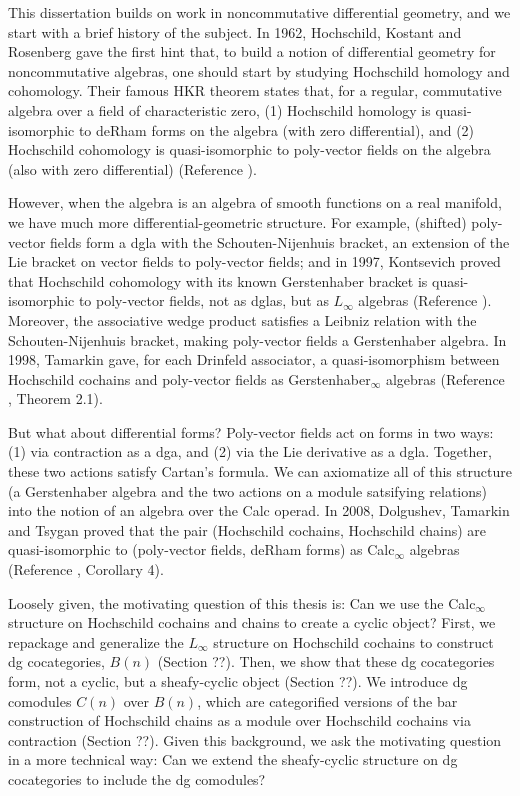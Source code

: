 \documentclass[12pt]{article} %
\begin{document}
This dissertation builds on work in noncommutative differential geometry, and we start with a brief history of the subject. In 1962, Hochschild, Kostant and Rosenberg gave the first hint that, to build a notion of differential geometry for noncommutative algebras, one should start by studying Hochschild homology and cohomology. Their famous HKR theorem states that, for a regular, commutative algebra over a field of characteristic zero, (1) Hochschild homology is quasi-isomorphic to deRham forms on the algebra (with zero differential), and (2) Hochschild cohomology is quasi-isomorphic to poly-vector fields on the algebra (also with zero differential) (Reference \cite{HKR}).

However, when the algebra is an algebra of smooth functions on a real manifold, we have much more differential-geometric structure. For example, (shifted) poly-vector fields form a dgla with the Schouten-Nijenhuis bracket, an extension of the Lie bracket on vector fields to poly-vector fields; and in 1997, Kontsevich proved that Hochschild cohomology with its known Gerstenhaber bracket is quasi-isomorphic to poly-vector fields, not as dglas, but as $L_\infty$ algebras (Reference \cite{K}). Moreover, the associative wedge product satisfies a Leibniz relation with the Schouten-Nijenhuis bracket, making poly-vector fields a Gerstenhaber algebra. In 1998, Tamarkin gave, for each Drinfeld associator, a quasi-isomorphism between Hochschild cochains and poly-vector fields as Gerstenhaber$_\infty$ algebras (Reference \cite{Tam}, Theorem 2.1).

But what about differential forms? Poly-vector fields act on forms in two ways: (1) via contraction as a dga, and (2) via the Lie derivative as a dgla. Together, these two actions satisfy Cartan's formula. We can axiomatize all of this structure (a Gerstenhaber algebra and the two actions on a module satsifying relations) into the notion of an algebra over the Calc operad. In 2008, Dolgushev, Tamarkin and Tsygan proved that the pair (Hochschild cochains, Hochschild chains) are quasi-isomorphic to (poly-vector fields, deRham forms) as Calc$_\infty$ algebras (Reference \cite{DTT}, Corollary 4).

Loosely given, the motivating question of this thesis is: Can we use the Calc$_\infty$ structure on Hochschild cochains and chains to create a cyclic object? First, we repackage and generalize the $L_\infty$ structure on Hochschild cochains to construct dg cocategories, $B(n)$ (Section ??). Then, we show that these dg cocategories form, not a cyclic, but a sheafy-cyclic object (Section ??). We introduce dg comodules $C(n)$ over $B(n)$, which are categorified versions of the bar construction of Hochschild chains as a module over Hochschild cochains via contraction (Section ??). Given this background, we ask the motivating question in a more technical way: Can we extend the sheafy-cyclic structure on dg cocategories to include the dg comodules?
\end{document}
